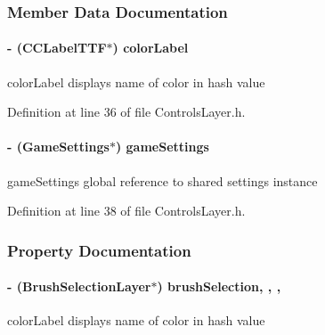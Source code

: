 \subsubsection{Member Data Documentation}
\hypertarget{interface_controls_layer_aa3d424dcbfa618632f97478ee61148cb}{
\paragraph[{color\-Label}]{\setlength{\rightskip}{0pt plus 5cm}-\/ (C\-C\-Label\-T\-T\-F$\ast$) color\-Label\hspace{0.3cm}{\ttfamily [protected]}}}\label{d1/d1a/interface_controls_layer_aa3d424dcbfa618632f97478ee61148cb}
color\-Label displays name of color in hash value 

Definition at line 36 of file Controls\-Layer.\-h.

\hypertarget{interface_controls_layer_a6fb04c60ed1bfab11e2940a025b4927e}{
\paragraph[{game\-Settings}]{\setlength{\rightskip}{0pt plus 5cm}-\/ ({\bf Game\-Settings}$\ast$) game\-Settings\hspace{0.3cm}{\ttfamily [protected]}}}\label{d1/d1a/interface_controls_layer_a6fb04c60ed1bfab11e2940a025b4927e}
game\-Settings global reference to shared settings instance 

Definition at line 38 of file Controls\-Layer.\-h.



\subsubsection{Property Documentation}
\hypertarget{interface_controls_layer_a56c514c5fde8025a9de19c4b8225478b}{
\paragraph[{brush\-Selection}]{\setlength{\rightskip}{0pt plus 5cm}-\/ ({\bf Brush\-Selection\-Layer}$\ast$) brush\-Selection\hspace{0.3cm}{\ttfamily [read]}, {\ttfamily [write]}, {\ttfamily [nonatomic]}, {\ttfamily [strong]}}}\label{d1/d1a/interface_controls_layer_a56c514c5fde8025a9de19c4b8225478b}
color\-Label displays name of color in hash value 

